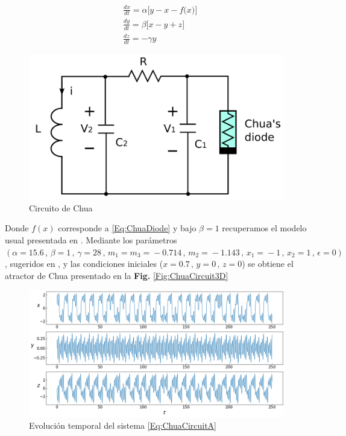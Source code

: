 \documentclass[11pt,letterpaper]{article}
\begin{document}
\begin{multicols*}{2}
\begin{align}
\label{Eq:ChuaCircuitA}
&\frac{dx}{dt} = \alpha\bigg[ y - x - f\big(x\big)\bigg] \nonumber \\ 
&\frac{dy}{dt} = \beta\bigg[ x - y + z\bigg]   \\
&\frac{dz}{dt} = -\gamma y \nonumber
\end{align}

\begin{figure}[H]
    \includegraphics[scale=0.25]{ChuaCircuit.png}
    \caption{Circuito de Chua \cite{Itoh2008}}
    \label{Fig:ChuaCircuit}
\end{figure}

Donde $f(x)$ corresponde a \ref{Eq:ChuaDiode} y bajo $\beta=1$ recuperamos el modelo usual presentada en \cite{Chua1994} . Mediante los parámetros $(\alpha\!=\!15.6 \,,\, \beta\!=\!1 \,,\, \gamma\!=\!28 \,,\, m_1\!=\!m_3\!=\!-0.714 \,,\, m_2\!=\!-1.143 \,,\, x_1\!=\!-1 \,,\, x_2\!=\!1 \,,\, \epsilon\!=\!0)$, sugeridos en \cite{ChuaCircuitSimulator}, y las condiciones iniciales ($x=0.7\,,\,y=0\,,\,z=0$) se obtiene el atractor de Chua presentado en la \textbf{Fig.} \ref{Fig:ChuaCircuit3D}

\begin{figure}[H]
    \centering
    \includegraphics[scale=0.245]{ChuaOscillator1D.png}
    \caption{Evolución temporal del sistema \ref{Eq:ChuaCircuitA}}
    \label{Fig:ChuaCircuit1D}
\end{figure}


\end{multicols*}
\end{document}
